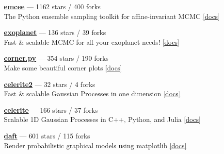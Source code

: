 \item \href{https://github.com/dfm/emcee}{{\bf emcee}} --- 1162 stars / 400 forks \\
The Python ensemble sampling toolkit for affine-invariant MCMC \href{https://emcee.readthedocs.io}{[docs]}

\item \href{https://github.com/exoplanet-dev/exoplanet}{{\bf exoplanet}} --- 136 stars / 39 forks \\
Fast {\&} scalable MCMC for all your exoplanet needs!  \href{https://docs.exoplanet.codes}{[docs]}

\item \href{https://github.com/dfm/corner.py}{{\bf corner.py}} --- 354 stars / 190 forks \\
Make some beautiful corner plots \href{http://corner.readthedocs.io}{[docs]}

\item \href{https://github.com/exoplanet-dev/celerite2}{{\bf celerite2}} --- 32 stars / 4 forks \\
Fast {\&} scalable Gaussian Processes in one dimension \href{https://celerite2.readthedocs.io}{[docs]}

\item \href{https://github.com/dfm/celerite}{{\bf celerite}} --- 166 stars / 37 forks \\
Scalable 1D Gaussian Processes in C++, Python, and Julia \href{http://celerite.rtfd.io}{[docs]}

\item \href{https://github.com/daft-dev/daft}{{\bf daft}} --- 601 stars / 115 forks \\
Render probabilistic graphical models using matplotlib \href{https://docs.daft-pgm.org}{[docs]}